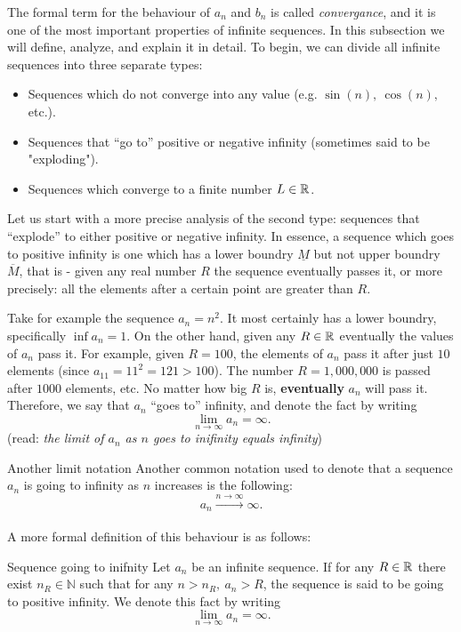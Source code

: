 The formal term for the behaviour of $a_{n}$ and $b_{n}$ is called \emph{convergance}, and it is one of the most important properties of infinite sequences. In this subsection we will define, analyze, and explain it in detail. To begin, we can divide all infinite sequences into three separate types:
\begin{itemize}
	\item Sequences which do not converge into any value (e.g. $\sin(n),\ \cos(n),$ etc.).
	\item Sequences that ``go to'' positive or negative infinity (sometimes said to be "exploding").
	\item Sequences which converge to a finite number $L\in\mathbb{R}^{}$.
\end{itemize}

Let us start with a more precise analysis of the second type: sequences that ``explode'' to either positive or negative infinity. In essence, a sequence which goes to positive infinity is one which has a lower boundry $\underline{M}$ but not upper boundry $\overline{M}$, that is - given any real number $R$ the sequence eventually passes it, or more precisely: all the elements after a certain point are greater than $R$.

Take for example the sequence $a_{n}=n^{2}$. It most certainly has a lower boundry, specifically $\inf a_{n}=1$. On the other hand, given any $R\in\mathbb{R}^{}$ eventually the values of $a_{n}$ pass it. For example, given $R=100$, the elements of $a_{n}$ pass it after just $10$ elements (since $a_{11}=11^{2}=121>100$). The number $R=1,000,000$ is passed after $1000$ elements, etc. No matter how big $R$ is, \textbf{eventually} $a_{n}$ will pass it. Therefore, we say that $a_{n}$ ``goes to'' infinity, and denote the fact by writing
\begin{equation}
	\lim\limits_{n\to\infty}a_{n}=\infty.
\end{equation}
(read: \textit{the limit of $a_{n}$ as $n$ goes to inifinity equals infinity})

\begin{note}{Another limit notation}{}
	Another common notation used to denote that a sequence $a_{n}$ is going to infinity as $n$ increases is the following:
	\[
		a_{n} \xrightarrow[]{n\to\infty} \infty.
	\]
\end{note}

A more formal definition of this behaviour is as follows:
\begin{definition}{Sequence going to inifnity}{}
	Let $a_{n}$ be an infinite sequence. If for any $R\in\mathbb{R}^{}$ there exist $n_{R}\in\mathbb{N}$ such that for any $n>n_{R},\ a_{n}>R$, the sequence is said to be going to positive infinity. We denote this fact by writing
\[
	\lim\limits_{n\to\infty}a_{n}=\infty.
\]
\end{definition}

